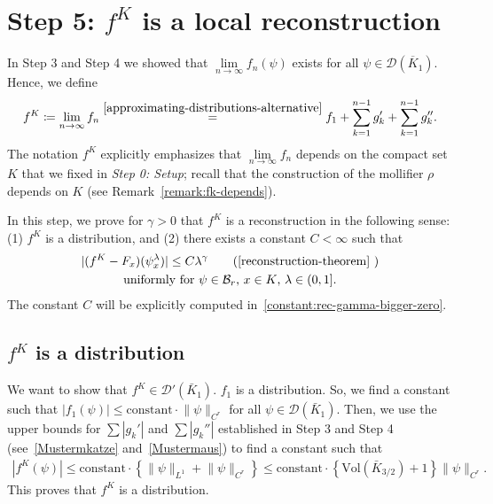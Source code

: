 \section{Step 5: \texorpdfstring{\(f^K\) is a local reconstruction}{fK satisfies the reconstruction theorem}}

In Step 3 and Step 4 we showed that \(\lim\limits_{n \to \infty}f_n(\psi)\) exists for all \(\psi \in \mathcal{D}(\overline{K}_1)\). Hence, we define
\begin{align*}
    f^K \coloneqq \lim\limits_{n \to \infty}f_n \overset{\eqref{approximating-distributions-alternative}}{=} f_1 + \sum^{n-1}_{k=1} g_k' + \sum^{n-1}_{k=1} g_k''.
\end{align*}
The notation \(f^K\) explicitly emphasizes that \(\lim\limits_{n \to \infty}f_n\) depends on the compact set \(K\) that we fixed in \emph{Step 0: Setup}; recall that the construction of the mollifier \(\rho\)  depends on \(K\) (see Remark~\ref{remark:fk-depends}).
 
In this step, we prove for \(\gamma > 0\) that \(f^K\) is a reconstruction in the following sense: (1) \(f^K\) is a distribution, and (2) there exists a constant \(C < \infty\) such that 
\begin{gather*}
    |(f^K - F_x)(\psi^\lambda_x)| \leq C \lambda^\gamma \tag{\ref{reconstruction-theorem}
    }\\ 
    \text{uniformly for \(\psi \in \mathcal{B}_r\), \(x \in K\), \(\lambda \in (0,1]\)}.
\end{gather*}
The constant \(C\) will be explicitly computed in~\eqref{constant:rec-gamma-bigger-zero}. 

\subsection*{\(f^K\) is a distribution} 

We want to show that \(f^K \in \mathcal{D}'(\bar K_1)\). \(f_1\) is a distribution. So, we find a constant such that \(|f_1(\psi)| \leq \mathrm{constant} \cdot \lVert \psi \rVert_{C^r}\) for all \(\psi \in \mathcal{D}(\bar K_1)\). Then, we use the upper bounds for \(\sum |g_k'|\) and \(\sum |g_k''|\) established in Step 3 and Step 4 (see~\eqref{Mustermkatze} and~\eqref{Mustermaus}) to find a constant such that  
\begin{align*}
    |f^K(\psi)| \leq \mathrm{constant} \cdot \left\{ \lVert \psi\rVert_{L^1} + \lVert \psi\rVert_{C^r} \right\} \leq  \mathrm{constant} \cdot \left\{  \mathrm{Vol}(\bar K_{3/2}) + 1 \right\} \lVert \psi \rVert_{C^r}.
\end{align*}
This proves that \(f^K\) is a distribution. 


